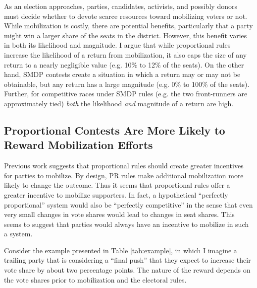 \documentclass[12pt]{article}
\begin{document}
As an election approaches, parties, candidates, activists, and possibly donors must  decide whether to devote scarce resources toward mobilizing voters or not. While mobilization is costly, there are potential benefits, particularly that a party might win a larger share of the seats in the district. However, this benefit varies in both its likelihood and  magnitude. I argue that while proportional rules increase the likelihood of a return from mobilization, it also caps the size of any return to a nearly negligible value (e.g. 10\% to 12\% of the seats). On the other hand, SMDP contests create a situation in which a return may or may not be obtainable, but any return has a large magnitude (e.g. 0\% to 100\% of the seats). Further, for competitive races under SMDP rules (e.g. the two front-runners are approximately tied) \textit{both} the likelihood \textit{and} magnitude of a return are high.

\subsection*{Proportional Contests Are More Likely to Reward Mobilization Efforts}

Previous work suggests that proportional rules should create greater incentives for parties to mobilize. By design, PR rules make additional mobilization more likely to change the outcome. Thus it seems that proportional rules offer a greater incentive to mobilize supporters. In fact, a hypothetical ``perfectly proportional'' system would also be ``perfectly competitive'' in the sense that even very small changes in vote shares would lead to changes in seat shares. This seems to suggest that parties would always have an incentive to mobilize in such a system. 

Consider the example presented in Table \ref{tab:example}, in which I imagine a trailing party that is considering a ``final push'' that they expect to increase their vote share by about two percentage points.  The nature of the reward depends on the vote shares prior to mobilization and the electoral rules.
\end{document}
